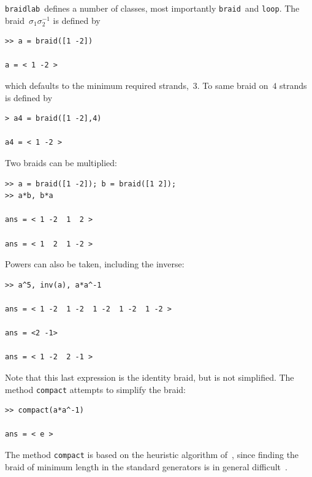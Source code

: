 \documentclass[12pt]{article}
\newcommand{\braidlab}{\texttt{braidlab}}%
\newcommand{\braid}{\texttt{braid}}%
\newcommand{\loopc}{\texttt{loop}}%
\begin{document}
\braidlab\ defines a number of classes, most importantly \braid\ and
\loopc.  The braid~$\sigma_1\sigma_2^{-1}$ is defined by
\begin{lstlisting}[frame=single,framerule=0pt]
>> a = braid([1 -2])

a = < 1 -2 >
\end{lstlisting}
which defaults to the minimum required strands,~$3$.  To same braid
on~$4$ strands is defined by
\begin{lstlisting}[frame=single,framerule=0pt]
> a4 = braid([1 -2],4)

a4 = < 1 -2 >
\end{lstlisting}
Two braids can be multiplied:
\begin{lstlisting}[frame=single,framerule=0pt]
>> a = braid([1 -2]); b = braid([1 2]);
>> a*b, b*a

ans = < 1 -2  1  2 >

ans = < 1  2  1 -2 >
\end{lstlisting}
Powers can also be taken, including the inverse:
\begin{lstlisting}[frame=single,framerule=0pt]
>> a^5, inv(a), a*a^-1

ans = < 1 -2  1 -2  1 -2  1 -2  1 -2 >

ans = <2 -1>

ans = < 1 -2  2 -1 >
\end{lstlisting}
Note that this last expression is the identity braid, but is not
simplified.  The method \lstinline{compact} attempts to simplify the
braid:
\begin{lstlisting}[frame=single,framerule=0pt]
>> compact(a*a^-1)

ans = < e >
\end{lstlisting}
The method \lstinline{compact} is based on the heuristic algorithm
of~\cite{Bangert2002}, since finding the braid of minimum length in
the standard generators is in general difficult~\citep{Paterson1991}.
\end{document}
